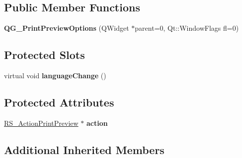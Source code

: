 \subsection*{Public Member Functions}
\begin{DoxyCompactItemize}
\item 
\hypertarget{classQG__PrintPreviewOptions_af02f55fe487f149db1a89eafbe400b20}{{\bfseries Q\-G\-\_\-\-Print\-Preview\-Options} (Q\-Widget $\ast$parent=0, Qt\-::\-Window\-Flags fl=0)}\label{classQG__PrintPreviewOptions_af02f55fe487f149db1a89eafbe400b20}

\end{DoxyCompactItemize}
\subsection*{Protected Slots}
\begin{DoxyCompactItemize}
\item 
\hypertarget{classQG__PrintPreviewOptions_a82797b1f9bcbdf063aafdc365c6fabd4}{virtual void {\bfseries language\-Change} ()}\label{classQG__PrintPreviewOptions_a82797b1f9bcbdf063aafdc365c6fabd4}

\end{DoxyCompactItemize}
\subsection*{Protected Attributes}
\begin{DoxyCompactItemize}
\item 
\hypertarget{classQG__PrintPreviewOptions_adc82e62346a1c53fa9c38d92de6c2628}{\hyperlink{classRS__ActionPrintPreview}{R\-S\-\_\-\-Action\-Print\-Preview} $\ast$ {\bfseries action}}\label{classQG__PrintPreviewOptions_adc82e62346a1c53fa9c38d92de6c2628}

\end{DoxyCompactItemize}
\subsection*{Additional Inherited Members}


